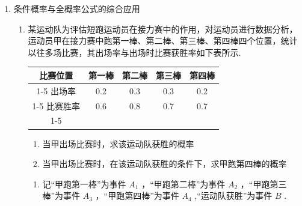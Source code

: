 \begin{enumerate}
\begin{enumerate}
\begin{jieda}
            $P\left( B\right)  = P\left( {A}_{0}\right) P\left( {B|{A}_{0}}\right)  + P\left( {A}_{1}\right) P\left( {B|{A}_{1}}\right)  + P\left( {A}_{2}\right) P\left( {B|{A}_{2}}\right) = \dfrac{1}{5} \times  \dfrac{1}{15} + \dfrac{3}{5} \times  \dfrac{1}{5} + \dfrac{1}{5} \times  \dfrac{2}{5} = \dfrac{16}{75}$
            
            $P\left( {{A}_{2}|B}\right)  = \dfrac{P\left( {B{A}_{2}}\right) }{P\left( B\right) } = \dfrac{P\left( {A}_{2}\right) P\left( {B|{A}_{2}}\right) }{P\left( B\right) } = \dfrac{3}{8}$
            
            即已知从乙袋中取出的是 2 个红球,则从甲袋中取出的也是 2 个红球的概率为 $\dfrac{3}{8}$
        \end{jieda}
    \end{enumerate}
    \item 条件概率与全概率公式的综合应用
    \begin{enumerate}
        \item 某运动队为评估短跑运动员在接力赛中的作用，对运动员进行数据分析，运动员甲在接力赛中跑第一棒、第二棒、第三棒、第四棒四个位置，统计以往多场比赛，其出场率与出场时比赛获胜率如下表所示.
        
        \begin{center}
        \begin{tabular}{|c|c|c|c|c|}
        \hline
        比赛位置 & 第一棒 & 第二棒 & 第三棒 & 第四棒 \\
        \cline{1-5}
        出场率 & 0.2 & 0.3 & 0.3 & 0.2 \\
        \cline{1-5}
        比赛胜率 & 0.6 & 0.8 & 0.7 & 0.7 \\
        \cline{1-5}
        \hline
        \end{tabular}
        \end{center}
        \begin{enumerate}
            \item 当甲出场比赛时，求该运动队获胜的概率
            \item 当甲出场比赛时，在该运动队获胜的条件下，求甲跑第四棒的概率
        \end{enumerate}
        \begin{jieda}
            \begin{enumerate}
                \item 记“甲跑第一棒”为事件 ${A}_{1}$ ，“甲跑第二棒”为事件 ${A}_{2}$ ，“甲跑第三棒”为事件 ${A}_{3}$ ，“甲跑第四棒”为事件 ${A}_{4}$ ,“运动队获胜”为事件 $B$ .
                

\end{enumerate}
\end{jieda}
\end{enumerate}
\end{enumerate}
